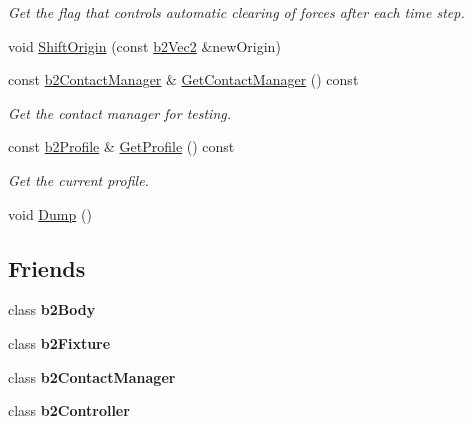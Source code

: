 \begin{DoxyCompactItemize}
\begin{DoxyCompactList}\small\item\em Get the flag that controls automatic clearing of forces after each time step. \end{DoxyCompactList}\item 
void \hyperlink{classb2_world_afc33e20e64252c5be115216051408047}{Shift\+Origin} (const \hyperlink{structb2_vec2}{b2\+Vec2} \&new\+Origin)
\item 
const \hyperlink{classb2_contact_manager}{b2\+Contact\+Manager} \& \hyperlink{classb2_world_a16259159ae1719c30808561c990a8c05}{Get\+Contact\+Manager} () const \hypertarget{classb2_world_a16259159ae1719c30808561c990a8c05}{}\label{classb2_world_a16259159ae1719c30808561c990a8c05}

\begin{DoxyCompactList}\small\item\em Get the contact manager for testing. \end{DoxyCompactList}\item 
const \hyperlink{structb2_profile}{b2\+Profile} \& \hyperlink{classb2_world_af41b3f1a21efc854b485d311911e24b2}{Get\+Profile} () const \hypertarget{classb2_world_af41b3f1a21efc854b485d311911e24b2}{}\label{classb2_world_af41b3f1a21efc854b485d311911e24b2}

\begin{DoxyCompactList}\small\item\em Get the current profile. \end{DoxyCompactList}\item 
void \hyperlink{classb2_world_a73c1fec260d460514edd335d4c235893}{Dump} ()
\end{DoxyCompactItemize}
\subsection*{Friends}
\begin{DoxyCompactItemize}
\item 
class {\bfseries b2\+Body}\hypertarget{classb2_world_a010ab52de250e5fe30a45d642f46405b}{}\label{classb2_world_a010ab52de250e5fe30a45d642f46405b}

\item 
class {\bfseries b2\+Fixture}\hypertarget{classb2_world_afb35b0e61f6ee3cc516c40ea251f3236}{}\label{classb2_world_afb35b0e61f6ee3cc516c40ea251f3236}

\item 
class {\bfseries b2\+Contact\+Manager}\hypertarget{classb2_world_aece264d42f69aed410f5eb3beba6ddf2}{}\label{classb2_world_aece264d42f69aed410f5eb3beba6ddf2}

\item 
class {\bfseries b2\+Controller}\hypertarget{classb2_world_ad0171f9dac44cc7aae065c618c0d165b}{}\label{classb2_world_ad0171f9dac44cc7aae065c618c0d165b}

\end{DoxyCompactItemize}


